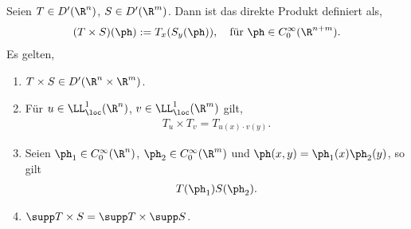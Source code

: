 \begin{prop}
\label{prop:3.36}
Seien $T\in D'(\R^n)$, $S\in D'(\R^m)$. Dann ist das direkte Produkt definiert
als,
\begin{align*}
(T\times S)(\ph) := T_x(S_y(\ph)),\quad \text{für }\ph\in C_0^\infty(\R^{n+m}).
\end{align*}
Es gelten,
\begin{enumerate}[label=(\roman{*})]
  \item\label{prop:3.36:1} $T\times S\in D'(\R^n\times \R^m)$.
  \item\label{prop:3.36:2} Für $u\in\LL_\loc^1(\R^n)$, $v\in\LL_\loc^1(\R^m)$
  gilt,
\begin{align*}
T_u\times T_v = T_{u(x)\cdot v(y)}.
\end{align*}
\item\label{prop:3.36:3} Seien $\ph_1\in C_0^\infty(\R^n)$, $\ph_2\in
C_0^\infty(\R^m)$ und $\ph(x,y)=\ph_1(x)\ph_2(y)$, so gilt
\begin{align*}
T(\ph_1)S(\ph_2).
\end{align*}
\item\label{prop:3.36:4} $\supp T\times S = \supp T\times \supp S$.\fishhere
\end{enumerate}
\end{prop}
